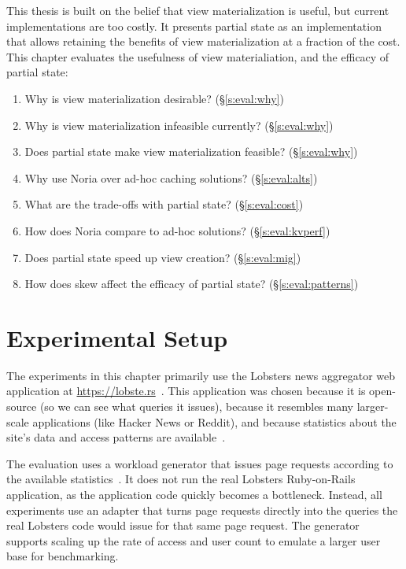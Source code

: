 This thesis is built on the belief that view materialization is useful, but
current implementations are too costly. It presents partial state as an
implementation that allows retaining the benefits of view materialization at a
fraction of the cost. This chapter evaluates the usefulness of view
materialiation, and the efficacy of partial state:

\begin{enumerate}
  \item Why is view materialization desirable? (\S\ref{s:eval:why})
  \item Why is view materialization infeasible currently? (\S\ref{s:eval:why})
  \item Does partial state make view materialization feasible? (\S\ref{s:eval:why})
  \item Why use Noria over ad-hoc caching solutions? (\S\ref{s:eval:alts})
  \item What are the trade-offs with partial state? (\S\ref{s:eval:cost})
  \item How does Noria compare to ad-hoc solutions? (\S\ref{s:eval:kvperf})
  \item Does partial state speed up view creation? (\S\ref{s:eval:mig})
  \item How does skew affect the efficacy of partial state? (\S\ref{s:eval:patterns})
\end{enumerate}

\section{Experimental Setup}
\label{s:eval:setup}

The experiments in this chapter primarily use the Lobsters news
aggregator web application at \url{https://lobste.rs}~\cite{lobsters}. This
application was chosen because it is open-source (so we can see what queries it
issues), because it resembles many larger-scale applications (like Hacker News
or Reddit), and because statistics about the site's data and access patterns are
available~\cite{lobsters-data}.

The evaluation uses a workload generator that issues page requests
according to the available statistics~\cite{generator}. It does not run the
real Lobsters Ruby-on-Rails application, as the application code quickly becomes
a bottleneck. Instead, all experiments use an adapter that turns page requests
directly into the queries the real Lobsters code would issue for that same page
request. The generator supports scaling up the rate of access and user count to
emulate a larger user base for benchmarking.

